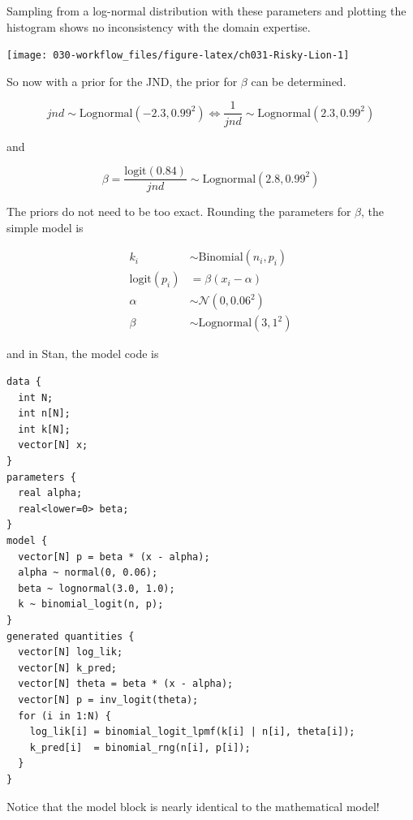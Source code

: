 \documentclass[11pt, oneside, openany]{scrbook}
\begin{document}

Sampling from a log-normal distribution with these parameters and plotting the histogram shows no inconsistency with the domain expertise.

\begin{center}\texttt{[image: 030-workflow\_files/figure-latex/ch031-Risky-Lion-1]} \end{center}

So now with a prior for the JND, the prior for \(\beta\) can be determined.


\[
jnd \sim \mathrm{Lognormal}(-2.3, 0.99^2) \Longleftrightarrow \frac{1}{jnd} \sim \mathrm{Lognormal}(2.3, 0.99^2)
\]

and


\[
\beta = \frac{\mathrm{logit}(0.84)}{jnd} \sim \mathrm{Lognormal}(2.8, 0.99^2)
\]

The priors do not need to be too exact. Rounding the parameters for \(\beta\), the simple model is


\begin{align*}
  k_i &\sim \mathrm{Binomial}(n_i, p_i) \\
  \mathrm{logit}(p_i) &= \beta ( x_i - \alpha ) \\
  \alpha &\sim \mathcal{N}(0, 0.06^2) \\
  \beta &\sim \mathrm{Lognormal}(3, 1^2)
\end{align*}

and in Stan, the model code is


\begin{verbatim}
data {
  int N;
  int n[N];
  int k[N];
  vector[N] x;
}
parameters {
  real alpha;
  real<lower=0> beta;
}
model {
  vector[N] p = beta * (x - alpha);
  alpha ~ normal(0, 0.06);
  beta ~ lognormal(3.0, 1.0);
  k ~ binomial_logit(n, p);
}
generated quantities {
  vector[N] log_lik;
  vector[N] k_pred;
  vector[N] theta = beta * (x - alpha);
  vector[N] p = inv_logit(theta);
  for (i in 1:N) {
    log_lik[i] = binomial_logit_lpmf(k[i] | n[i], theta[i]);
    k_pred[i]  = binomial_rng(n[i], p[i]);
  }
}
\end{verbatim}


Notice that the model block is nearly identical to the mathematical model!
\end{document}
